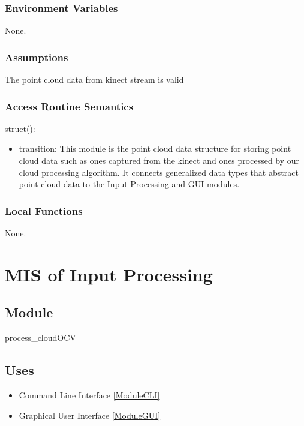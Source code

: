 \documentclass[12pt, titlepage]{article}
\begin{document}
\subsubsection{Environment Variables}

None.

\subsubsection{Assumptions}

The point cloud data from kinect stream is valid

\subsubsection{Access Routine Semantics}

\noindent struct():
\begin{itemize}
\item transition: This module is the point cloud data structure for storing point cloud data such as ones captured from the kinect and ones processed by our cloud processing algorithm. It connects generalized data types that abstract point cloud data to the Input Processing and GUI modules.
\end{itemize}


\subsubsection{Local Functions}

None.

\newpage

\section{MIS of Input Processing} \label{ModuleIP} 


\subsection{Module}

process\_cloudOCV

\subsection{Uses}

\begin{itemize}
\item Command Line Interface \ref{ModuleCLI}
\item Graphical User Interface \ref{ModuleGUI}
\end{itemize}
\end{document}
